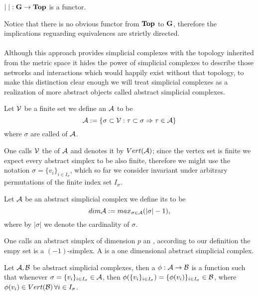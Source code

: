 \documentclass[../1.tex]{subfiles}
\begin{document}
    \begin{thm}
        $|\;| : \textbf{G} \to \textbf{Top}$ is a functor.
    \end{thm}

    Notice that there is no obvious functor from $\textbf{Top}$ to $\textbf{G}$, therefore the implications reguarding equivalences are strictly directed.\\
    \hfill \\
    Although this approach provides simplicial complexes with the topology inherited from the metric space it hides the power of simplicial complexes 
    to describe those networks and interactions which would happily exist without that topology, to make this distinction clear enough we will treat
    simplicial complexes as a realization of more abstract objects called abstract simplicial complexes.
    
    \begin{defn}
        Let $\mathcal{V}$ be a finite set we define an  $\mathcal{A}$ to be 
        \[\mathcal{A}:=\{ \sigma  \subset \mathcal{V} : \tau \subset \sigma \Rightarrow \tau \in \mathcal{A} \}\] 
        where $\sigma$ are called  of $\mathcal{A}$.
    \end{defn}
    
    One calls $\mathcal{V}$ the  of $\mathcal{A}$ and denotes it by $Vert(\mathcal{A})$; since the vertex
    set is finite we expect every abstract simplex to be also finite, therefore we might use the notation $\sigma = \{ v_i \}_{i \in I_\sigma}$,
    which so far we consider invariant under arbitrary permutations of the finite index set $I_\sigma$.

    \begin{defn}
        Let $\mathcal{A}$ be an abstract simplicial complex we define its  to be
        \[ dim \mathcal{A} := max_{\sigma \in \mathcal{A}}(|\sigma|-1), \]
        where by $|\sigma|$ we denote the cardinality of $\sigma$.
    \end{defn}

    One calls an abstract simplex of dimension $p$ an , according to our
    definition the empy set is a $(-1)$-simplex. A  is a one dimensional abstract simplicial complex.

    \begin{defn}
        Let $\mathcal{A},\mathcal{B}$ be abstract simplicial complexes, then a  $\phi : \mathcal{A} \to \mathcal{B}$ is a function 
        such that whenever $\sigma = \{v_i\}_{i \in I_\sigma} \in \mathcal{A}$, then $\phi(\{v_i\}_{i \in I_\sigma}) = \{\phi(v_i)\}_{i \in I_\sigma} \in \mathcal{B}$,
        where $\phi(v_i) \in Vert(\mathcal{B}) \, \forall i \in I_\sigma$.
    \end{defn}
\end{document}
